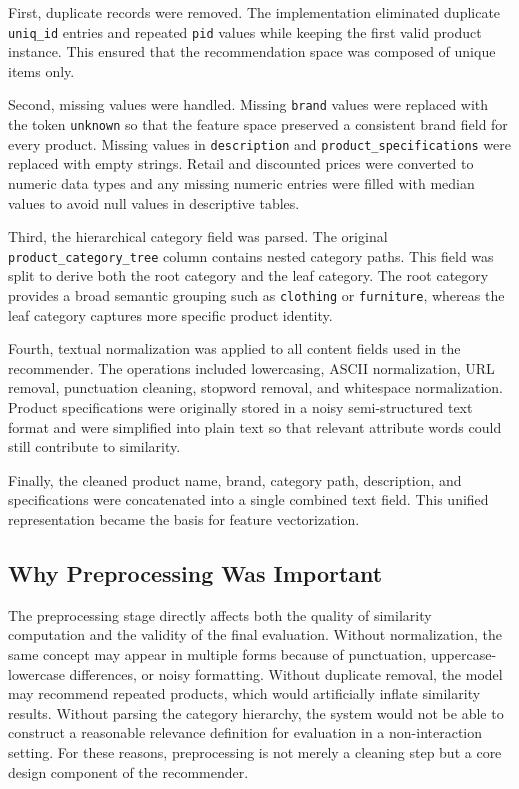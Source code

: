 \documentclass[conference]{IEEEtran}
\begin{document}
First, duplicate records were removed. The implementation eliminated duplicate \texttt{uniq\_id} entries and repeated \texttt{pid} values while keeping the first valid product instance. This ensured that the recommendation space was composed of unique items only.

Second, missing values were handled. Missing \texttt{brand} values were replaced with the token \texttt{unknown} so that the feature space preserved a consistent brand field for every product. Missing values in \texttt{description} and \texttt{product\_specifications} were replaced with empty strings. Retail and discounted prices were converted to numeric data types and any missing numeric entries were filled with median values to avoid null values in descriptive tables.

Third, the hierarchical category field was parsed. The original \texttt{product\_category\_tree} column contains nested category paths. This field was split to derive both the root category and the leaf category. The root category provides a broad semantic grouping such as \texttt{clothing} or \texttt{furniture}, whereas the leaf category captures more specific product identity.

Fourth, textual normalization was applied to all content fields used in the recommender. The operations included lowercasing, ASCII normalization, URL removal, punctuation cleaning, stopword removal, and whitespace normalization. Product specifications were originally stored in a noisy semi-structured text format and were simplified into plain text so that relevant attribute words could still contribute to similarity.

Finally, the cleaned product name, brand, category path, description, and specifications were concatenated into a single combined text field. This unified representation became the basis for feature vectorization.

\subsection{Why Preprocessing Was Important}
The preprocessing stage directly affects both the quality of similarity computation and the validity of the final evaluation. Without normalization, the same concept may appear in multiple forms because of punctuation, uppercase-lowercase differences, or noisy formatting. Without duplicate removal, the model may recommend repeated products, which would artificially inflate similarity results. Without parsing the category hierarchy, the system would not be able to construct a reasonable relevance definition for evaluation in a non-interaction setting. For these reasons, preprocessing is not merely a cleaning step but a core design component of the recommender.
\end{document}
